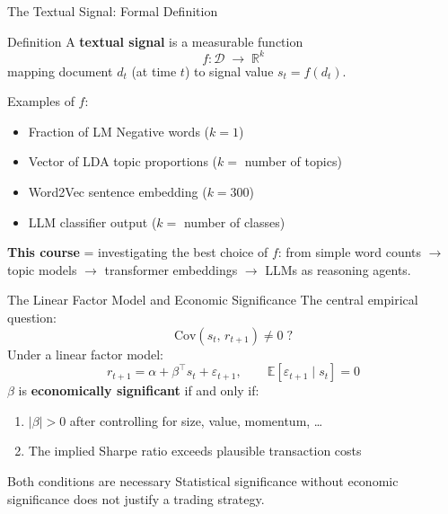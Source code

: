 \documentclass[9pt,t]{beamer}
\begin{document}
\begin{frame}{The Textual Signal: Formal Definition}
  \begin{block}{Definition}
    A \textbf{textual signal} is a measurable function
    \[
      f \colon \mathcal{D} \;\longrightarrow\; \mathbb{R}^k
    \]
    mapping document $d_t$ (at time $t$) to signal value $s_t = f(d_t)$.
  \end{block}
  \medskip
  Examples of $f$:
  \begin{itemize}
    \item Fraction of LM Negative words ($k=1$)
    \item Vector of LDA topic proportions ($k = $ number of topics)
    \item Word2Vec sentence embedding ($k = 300$)
    \item LLM classifier output ($k = $ number of classes)
  \end{itemize}
  \medskip
  \textbf{This course} = investigating the best choice of $f$:
  from simple word counts $\to$ topic models $\to$ transformer embeddings $\to$ LLMs as reasoning agents.
\end{frame}

\begin{frame}{The Linear Factor Model and Economic Significance}
  The central empirical question:
  \[
    \mathrm{Cov}(s_t,\, r_{t+1}) \neq 0 \;?
  \]
  Under a linear factor model:
  \[
    r_{t+1} = \alpha + \beta^\top s_t + \varepsilon_{t+1}, \qquad
    \mathbb{E}[\varepsilon_{t+1} \mid s_t] = 0
  \]
  \medskip
  $\beta$ is \textbf{economically significant} if and only if:
  \begin{enumerate}
    \item $|\beta| > 0$ after controlling for size, value, momentum, \ldots
    \item The implied Sharpe ratio exceeds plausible transaction costs
  \end{enumerate}
  \medskip
  \begin{alertblock}{Both conditions are necessary}
    Statistical significance without economic significance does not justify a trading strategy.
  \end{alertblock}
\end{frame}
\end{document}
